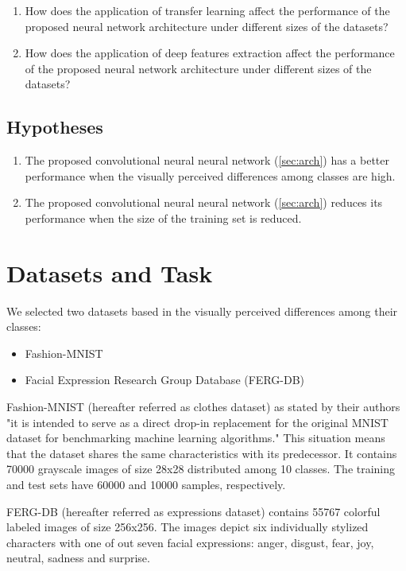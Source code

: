 \documentclass{article}
\begin{document}
\begin{enumerate}
  \item How does the application of transfer learning affect the performance of the proposed neural network architecture under different sizes of the datasets?
  \item How does the application of deep features extraction affect the performance of the proposed neural network architecture under different sizes of the datasets?
\end{enumerate}

\subsection{Hypotheses}
\label{sec:hypotheses}
\begin{enumerate}[label=\textbf{H.\arabic*}]
  \item \label{h:1} The proposed convolutional neural neural network (\ref{sec:arch}) has a better performance when the visually perceived differences among classes are high.
  \item \label{h:2} The proposed convolutional neural neural network (\ref{sec:arch}) reduces its performance when the size of the training set is reduced. 
 \end{enumerate}

\section{Datasets and Task}
\label{sec:data}

We selected two datasets based in the visually perceived differences among their classes: 
\begin{itemize}
  \item Fashion-MNIST \citep{DBLP:journals/corr/abs-1708-07747}
  \item Facial Expression Research Group Database (FERG-DB)\citep{aneja2016modeling}
\end{itemize}

Fashion-MNIST (hereafter referred as clothes dataset) as stated by their authors "it is intended to serve as a direct drop-in replacement for the original MNIST dataset for benchmarking machine learning algorithms." This situation means that the dataset shares the same characteristics with its predecessor. It contains 70000 grayscale images of size 28x28 distributed among 10 classes. The training and test sets have 60000 and 10000 samples, respectively.

FERG-DB (hereafter referred as expressions dataset) contains 55767 colorful labeled images of size 256x256. The images depict six individually stylized characters with one of out seven facial expressions: anger, disgust, fear, joy, neutral, sadness and surprise.
\end{document}
